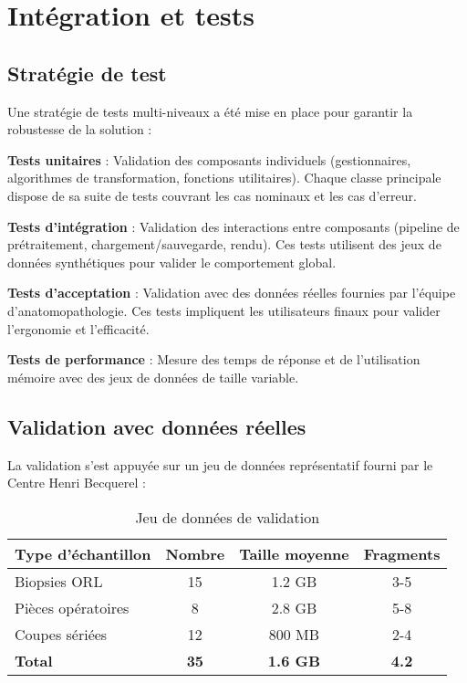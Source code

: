\documentclass[12pt,a4paper]{report}
\begin{document}
\section{Intégration et tests}

\subsection{Stratégie de test}

Une stratégie de tests multi-niveaux a été mise en place pour garantir la robustesse de la solution :

\textbf{Tests unitaires} : Validation des composants individuels (gestionnaires, algorithmes de transformation, fonctions utilitaires). Chaque classe principale dispose de sa suite de tests couvrant les cas nominaux et les cas d'erreur.

\textbf{Tests d'intégration} : Validation des interactions entre composants (pipeline de prétraitement, chargement/sauvegarde, rendu). Ces tests utilisent des jeux de données synthétiques pour valider le comportement global.

\textbf{Tests d'acceptation} : Validation avec des données réelles fournies par l'équipe d'anatomopathologie. Ces tests impliquent les utilisateurs finaux pour valider l'ergonomie et l'efficacité.

\textbf{Tests de performance} : Mesure des temps de réponse et de l'utilisation mémoire avec des jeux de données de taille variable.

\subsection{Validation avec données réelles}

La validation s'est appuyée sur un jeu de données représentatif fourni par le Centre Henri Becquerel :

\begin{table}[H]
\centering
\caption{Jeu de données de validation}
\label{tab:donnees_validation}
\begin{tabular}{|l|c|c|c|}
\hline
\textbf{Type d'échantillon} & \textbf{Nombre} & \textbf{Taille moyenne} & \textbf{Fragments} \\
\hline
Biopsies ORL & 15 & 1.2 GB & 3-5 \\
Pièces opératoires & 8 & 2.8 GB & 5-8 \\
Coupes sériées & 12 & 800 MB & 2-4 \\
\hline
\textbf{Total} & \textbf{35} & \textbf{1.6 GB} & \textbf{4.2} \\
\hline
\end{tabular}
\end{table}
\end{document}
